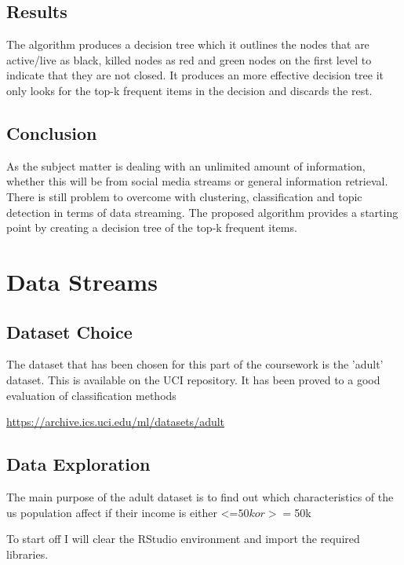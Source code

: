 \documentclass[10pt  ,usenames, dvipsnames]{article}\usepackage[]{graphicx}\usepackage[]{color}
\begin{document}
\subsection{Results}
The algorithm produces a decision tree which it outlines the nodes that are active/live as black, killed nodes as red and green nodes on the first level to indicate that they are not closed. It produces an more effective decision tree it only looks for the top-k frequent items in the decision and discards the rest.

\subsection{Conclusion}
As the subject matter is dealing with an unlimited amount of information, whether this will be from social media streams or general information retrieval. There is still problem to overcome with clustering, classification and topic detection in terms of data streaming. The proposed algorithm provides a starting point by creating a decision tree of the top-k frequent items.


\clearpage



\section {Data Streams}

\subsection{Dataset Choice}

The dataset that has been chosen for this part of the coursework is the 'adult' dataset. This is available on the UCI repository. It has been proved to a good evaluation of classification methods

\url{https://archive.ics.uci.edu/ml/datasets/adult}



\subsection{Data Exploration}

The main purpose of the adult dataset is to find out which characteristics of the us population affect if their income is either <=$50k or >=$50k



To start off I will clear the RStudio environment and import the required libraries.
\end{document}
